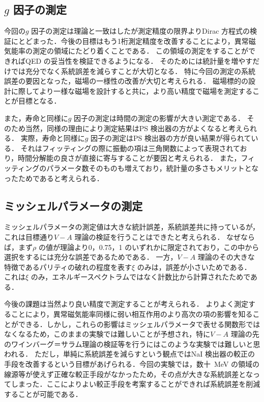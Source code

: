 \subsection{$g$ 因子の測定}
今回の$g$ 因子の測定は理論と一致はしたが測定精度の限界よりDirac 方程式の検証にとどまった．今後の目標はもう1桁測定精度を改善することにより，異常磁気能率の測定の領域にたどり着くことである．
この領域の測定をすることができればQED の妥当性を検証できるようになる．
そのためには統計量を増やすだけでは充分でなく系統誤差を減らすことが大切となる．
特に今回の測定の系統誤差の要因となった，磁場の一様性の改善が大切と考えられる．
磁場標的の設計に際してより一様な磁場を設計すると共に，より高い精度で磁場を測定することが目標となる．

また，寿命と同様に$g$ 因子の測定は時間の測定の影響が大きい測定である．
そのため当然，同様の理由により測定結果はPS 検出器の方がよくなると考えられる．
実際，寿命と同様に$g$ 因子の測定はPS 検出器の方が良い結果が得られている．
それはフィッティングの際に振動の項は三角関数によって表現されており，時間分解能の良さが直接に寄与することが要因と考えられる．
また，フィッティングのパラメータ数そのものも増えており，統計量の多さもメリットとなったためであると考えられる．

\subsection{ミッシェルパラメータの測定}
ミッシェルパラメータの測定値は大きな統計誤差，系統誤差共に持っているが，これは目標通り$V-A$ 理論の検証を行うことはできたと考えられる．
なぜならば，まず$\rho$ の値が理論より0，0.75，1 のいずれかに限定されており，この中から選択をするには充分な誤差であるためである．
一方，$V-A$ 理論のその大きな特徴であるパリティの破れの程度を表す$\xi$ のみは，誤差が小さいためである．
これは$\xi$ のみ，エネルギースペクトラムではなく計数比から計算されたためである．

今後の課題は当然より良い精度で測定することが考えられる．
よりよく測定することにより，異常磁気能率同様に弱い相互作用のより高次の項の影響を知ることができる．しかし，これらの影響はミッシェルパラメータで表せる関数形ではなくなるため，このままの実験では難しいことが予想され，特に$V-A$ 理論の先のワインバーグ＝サラム理論の検証等を行うにはこのような実験では難しいと思われる．
ただし，単純に系統誤差を減らすという観点ではNaI 検出器の較正の手段を改善するという目標があげられる．今回の実験では，数十~MeV の領域の線源等が使えず正確な較正手段がなかったため，その点が大きな系統誤差となってしまった．ここによりよい較正手段を考案することができれば系統誤差を削減することが可能である．

